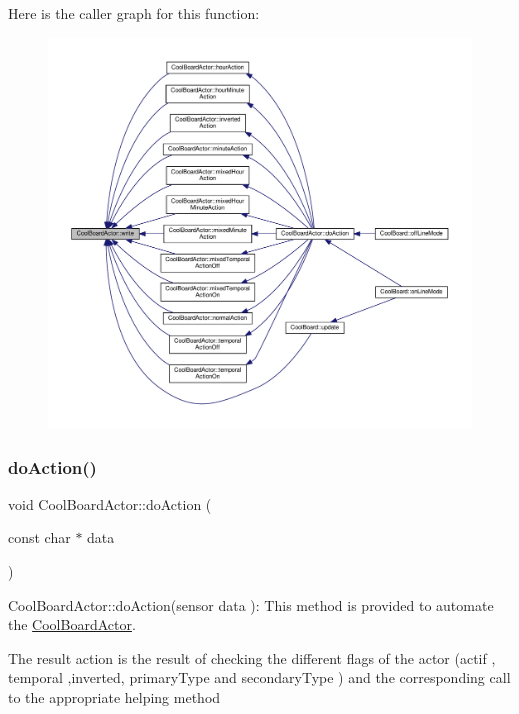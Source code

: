 Here is the caller graph for this function\+:
\nopagebreak
\begin{figure}[H]
\begin{center}
\leavevmode
\includegraphics[width=350pt]{dc/d69/class_cool_board_actor_a958786ff01ea1056ee72c72d439f86da_icgraph}
\end{center}
\end{figure}
\mbox{\label{class_cool_board_actor_a96a45658d32c6b95caa2f385c7da32cd}} 
\subsubsection{\texorpdfstring{do\+Action()}{doAction()}}
{\footnotesize\ttfamily void Cool\+Board\+Actor\+::do\+Action (\begin{DoxyParamCaption}\item[{const char $\ast$}]{data }\end{DoxyParamCaption})}

Cool\+Board\+Actor\+::do\+Action(sensor data )\+: This method is provided to automate the \hyperlink{class_cool_board_actor}{Cool\+Board\+Actor}.

The result action is the result of checking the different flags of the actor (actif , temporal ,inverted, primary\+Type and secondary\+Type ) and the corresponding call to the appropriate helping method 

